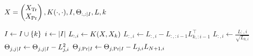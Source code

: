 \begin{algorithmic}[1]
  \REQUIRE \(
    X = \begin{pmatrix} X_{\text{Tr}} \\ X_{\text{Pr}} \end{pmatrix},
    K(\cdot, \cdot), I, \Theta_{:, : \mid I}, L, k
  \)

  \STATE \( I \gets I \cup \{ k \} \)
  \STATE \( i \gets \lvert I\rvert \)
  \STATE \( L_{:, i} \gets K(X, X_k) \)
  \STATE \( L_{:, i} \gets L_{:, i} - L_{:, :i - 1} L_{k, :i - 1}^{\top} \)
  \STATE \( L_{:, i} \gets \frac{L{:, i}}{\sqrt{L_{k, i}}} \)
    \STATE \(
      \Theta_{j, j \mid I} \gets
      \Theta_{j, j \mid I} -
      L_{j, i}^2
    \)
    \STATE \(
      \Theta_{j, \text{Pr} \mid I} \gets
      \Theta_{j, \text{Pr} \mid I} -
      L_{j, i} L_{N + 1, i}
    \)
  \ENDFOR
\end{algorithmic}
